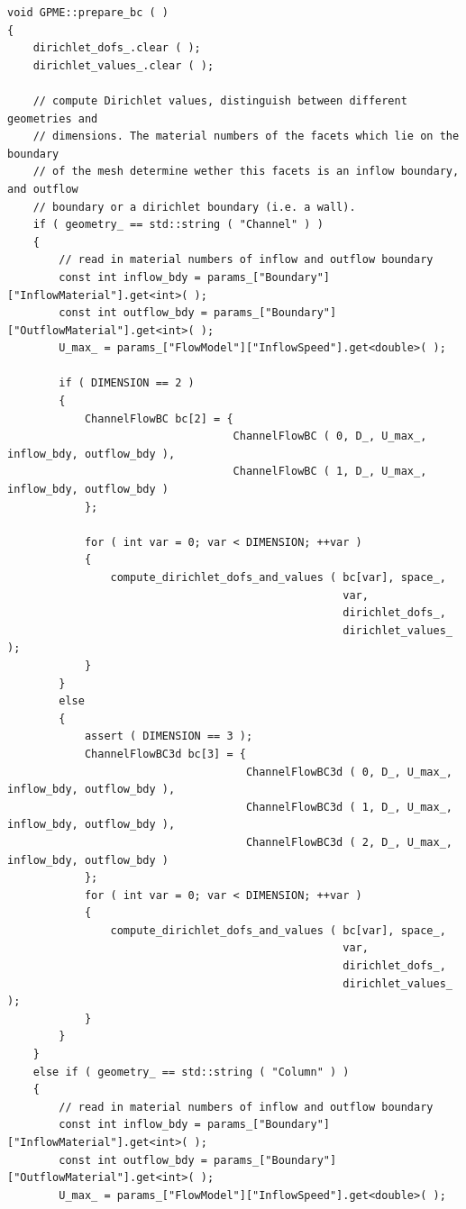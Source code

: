 \documentclass{article}
\begin{document}
\begin{lstlisting}[firstnumber=410]
void GPME::prepare_bc ( )
{
    dirichlet_dofs_.clear ( );
    dirichlet_values_.clear ( );

    // compute Dirichlet values, distinguish between different geometries and
    // dimensions. The material numbers of the facets which lie on the boundary
    // of the mesh determine wether this facets is an inflow boundary, and outflow
    // boundary or a dirichlet boundary (i.e. a wall).
    if ( geometry_ == std::string ( "Channel" ) )
    {
        // read in material numbers of inflow and outflow boundary
        const int inflow_bdy = params_["Boundary"]["InflowMaterial"].get<int>( );
        const int outflow_bdy = params_["Boundary"]["OutflowMaterial"].get<int>( );
        U_max_ = params_["FlowModel"]["InflowSpeed"].get<double>( );

        if ( DIMENSION == 2 )
        {
            ChannelFlowBC bc[2] = {
                                   ChannelFlowBC ( 0, D_, U_max_, inflow_bdy, outflow_bdy ),
                                   ChannelFlowBC ( 1, D_, U_max_, inflow_bdy, outflow_bdy )
            };

            for ( int var = 0; var < DIMENSION; ++var )
            {
                compute_dirichlet_dofs_and_values ( bc[var], space_, 
                                                    var,
                                                    dirichlet_dofs_, 
                                                    dirichlet_values_ );
            }
        }
        else
        {
            assert ( DIMENSION == 3 );
            ChannelFlowBC3d bc[3] = {
                                     ChannelFlowBC3d ( 0, D_, U_max_, inflow_bdy, outflow_bdy ),
                                     ChannelFlowBC3d ( 1, D_, U_max_, inflow_bdy, outflow_bdy ),
                                     ChannelFlowBC3d ( 2, D_, U_max_, inflow_bdy, outflow_bdy )
            };
            for ( int var = 0; var < DIMENSION; ++var )
            {
                compute_dirichlet_dofs_and_values ( bc[var], space_, 
                                                    var,
                                                    dirichlet_dofs_, 
                                                    dirichlet_values_ );
            }
        }
    }
    else if ( geometry_ == std::string ( "Column" ) )
    {
        // read in material numbers of inflow and outflow boundary
        const int inflow_bdy = params_["Boundary"]["InflowMaterial"].get<int>( );
        const int outflow_bdy = params_["Boundary"]["OutflowMaterial"].get<int>( );
        U_max_ = params_["FlowModel"]["InflowSpeed"].get<double>( );


\end{lstlisting}
\end{document}
